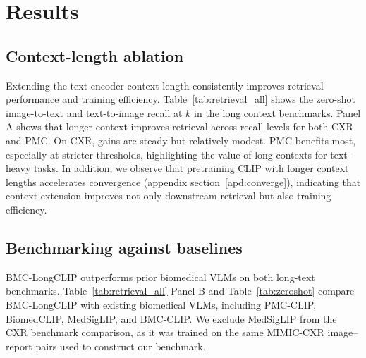 \section{Results}
\label{sec:results}


\subsection{Context-length ablation}
Extending the text encoder context length consistently improves retrieval performance and training efficiency.
Table~\ref{tab:retrieval_all} shows the zero-shot image-to-text and text-to-image recall at $k$ in the long context benchmarks. 
Panel A shows that longer context improves retrieval across recall levels for both CXR and PMC.
On CXR, gains are steady but relatively modest. 
PMC benefits most, especially at stricter thresholds, highlighting the value of long contexts for text-heavy tasks.
In addition, we observe that pretraining CLIP with longer context lengths accelerates convergence (appendix section~\ref{apd:converge}), indicating that context extension improves not only downstream retrieval but also training efficiency.




\subsection{Benchmarking against baselines}
BMC-LongCLIP outperforms prior biomedical VLMs on both long-text benchmarks. Table~\ref{tab:retrieval_all} Panel B and Table~\ref{tab:zeroshot} compare BMC-LongCLIP with existing biomedical VLMs, including PMC-CLIP, BiomedCLIP, MedSigLIP, and BMC-CLIP. We exclude MedSigLIP from the CXR benchmark comparison, as it was trained on the same MIMIC-CXR image–report pairs used to construct our benchmark.



